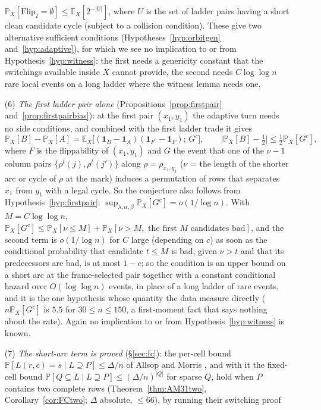 \documentclass[11pt]{article}
\theoremstyle{definition}
\newcommand{\E}{\mathbb{E}}
\renewcommand{\Pr}{\mathbb{P}}
\begin{document}
\begin{enumerate}[leftmargin=2em]
$\Pr_X[\mathrm{Flip}_I=\emptyset]\le\E_X[2^{-|U|}]$, where $U$ is the set of ladder pairs
having a short clean candidate cycle (subject to a collision condition).  These give two
alternative sufficient conditions (Hypotheses~\ref{hyp:orbitgen} and~\ref{hyp:adaptive}),
for which we see no implication to or from Hypothesis~\ref{hyp:witness}: the first needs a
genericity constant that the switchings available inside $X$ cannot provide, the second
needs $C\log\log n$ rare local events on a long ladder where the witness lemma needs one.
\item[(6)] \emph{The first ladder pair alone} (Propositions~\ref{prop:firstpair}
and~\ref{prop:firstpairbias}): at the first pair $(x_1,y_1)$ the adaptive turn needs no
side conditions, and combined with the first ladder trade it gives
\[
\Pr_X[B]-\Pr_X[A]=\E_X\bigl[(\mathbf 1_B-\mathbf 1_A)(\mathbf 1_{F^c}-\mathbf 1_F);\,G^c\bigr],
\qquad\bigl|\Pr_X[B]-\tfrac12\bigr|\le\tfrac12\Pr_X[G^c],
\]
where $F$ is the flippability of $(x_1,y_1)$ and $G$ the event that one of the $\nu-1$
column pairs $\{\rho^t(j),\rho^t(j')\}$ along $\rho=\rho_{x_1,y_1}$ ($\nu$ = the length of
the shorter arc or cycle of $\rho$ at the mark) induces a permutation of rows that separates
$x_1$ from $y_1$ with a legal cycle.  So the conjecture also follows from
Hypothesis~\ref{hyp:firstpair}: $\sup_{\lambda,\alpha,\beta}\Pr_X[G^c]=o(1/\log n)$.  With
$M=C\log\log n$, $\Pr_X[G^c]\le\Pr_X[\nu\le M]+\Pr_X[\nu>M,\text{ the first }M\text{ candidates bad}]$,
and the second term is $o(1/\log n)$ for $C$ large (depending on $c$) as soon as the
conditional probability that candidate $t\le M$ is bad, given $\nu>t$ and that its
predecessors are bad, is at most $1-c$; so the condition is
an upper bound on a short arc at the frame-selected pair together with a constant
conditional hazard over $O(\log\log n)$ events, in place of a long ladder of rare events,
and it is the one hypothesis whose quantity the data measure directly ($n\Pr_X[G^c]$ is
$5.5$ for $30\le n\le150$, a first-moment fact that says nothing about the rate).  Again
no implication to or from Hypothesis~\ref{hyp:witness} is known.
\item[(7)] \emph{The short-arc term is proved} (\S\ref{sec:fc}): the per-cell bound
$\Pr[L(r,c)=s\mid L\supseteq P]\le\Delta/n$ of Allsop and Morris \cite{AM26}, and with it
the fixed-cell bound $\Pr[Q\subseteq L\mid L\supseteq P]\le(\Delta/n)^{|Q|}$ for sparse
$Q$, hold when $P$ contains two complete rows (Theorem~\ref{thm:AM31two},
Corollary~\ref{cor:FCtwo}; $\Delta$ absolute, $\le66$), by running their switching proof

\end{enumerate}
\end{document}
